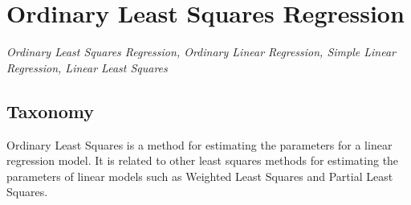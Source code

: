 
\section{Ordinary Least Squares Regression} 
\label{sec:ordinary}

\emph{Ordinary Least Squares Regression, Ordinary Linear Regression, Simple Linear Regression, Linear Least Squares}

\subsection{Taxonomy}
Ordinary Least Squares is a method for estimating the parameters for a linear regression model.
It is related to other least squares methods for estimating the parameters of linear models such as Weighted Least Squares and Partial Least Squares.


